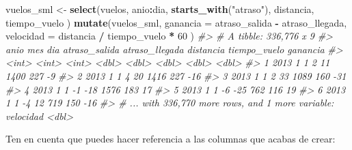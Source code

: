 \documentclass[11pt,oneside]{report}
\newenvironment{Shaded}{\begin{snugshade}}{\end{snugshade}}
\newcommand{\CommentTok}[1]{\textcolor[rgb]{0.56,0.35,0.01}{\textit{#1}}}
\newcommand{\DataTypeTok}[1]{\textcolor[rgb]{0.13,0.29,0.53}{#1}}
\newcommand{\DecValTok}[1]{\textcolor[rgb]{0.00,0.00,0.81}{#1}}
\newcommand{\KeywordTok}[1]{\textcolor[rgb]{0.13,0.29,0.53}{\textbf{#1}}}
\newcommand{\NormalTok}[1]{#1}
\newcommand{\OperatorTok}[1]{\textcolor[rgb]{0.81,0.36,0.00}{\textbf{#1}}}
\newcommand{\StringTok}[1]{\textcolor[rgb]{0.31,0.60,0.02}{#1}}
\begin{document}
\begin{Shaded}
\begin{Highlighting}[]
\NormalTok{vuelos_sml <-}\StringTok{ }\KeywordTok{select}\NormalTok{(vuelos,}
\NormalTok{  anio}\OperatorTok{:}\NormalTok{dia,}
  \KeywordTok{starts_with}\NormalTok{(}\StringTok{"atraso"}\NormalTok{),}
\NormalTok{  distancia,}
\NormalTok{  tiempo_vuelo}
\NormalTok{)}
\KeywordTok{mutate}\NormalTok{(vuelos_sml,}
  \DataTypeTok{ganancia =}\NormalTok{ atraso_salida }\OperatorTok{-}\StringTok{ }\NormalTok{atraso_llegada,}
  \DataTypeTok{velocidad =}\NormalTok{ distancia }\OperatorTok{/}\StringTok{ }\NormalTok{tiempo_vuelo }\OperatorTok{*}\StringTok{ }\DecValTok{60}
\NormalTok{)}
\CommentTok{#> # A tibble: 336,776 x 9}
\CommentTok{#>    anio   mes   dia atraso_salida atraso_llegada distancia tiempo_vuelo ganancia}
\CommentTok{#>   <int> <int> <int>         <dbl>          <dbl>     <dbl>        <dbl>    <dbl>}
\CommentTok{#> 1  2013     1     1             2             11      1400          227       -9}
\CommentTok{#> 2  2013     1     1             4             20      1416          227      -16}
\CommentTok{#> 3  2013     1     1             2             33      1089          160      -31}
\CommentTok{#> 4  2013     1     1            -1            -18      1576          183       17}
\CommentTok{#> 5  2013     1     1            -6            -25       762          116       19}
\CommentTok{#> 6  2013     1     1            -4             12       719          150      -16}
\CommentTok{#> # ... with 336,770 more rows, and 1 more variable: velocidad <dbl>}
\end{Highlighting}
\end{Shaded}

Ten en cuenta que puedes hacer referencia a las columnas que acabas de
crear:
\end{document}
